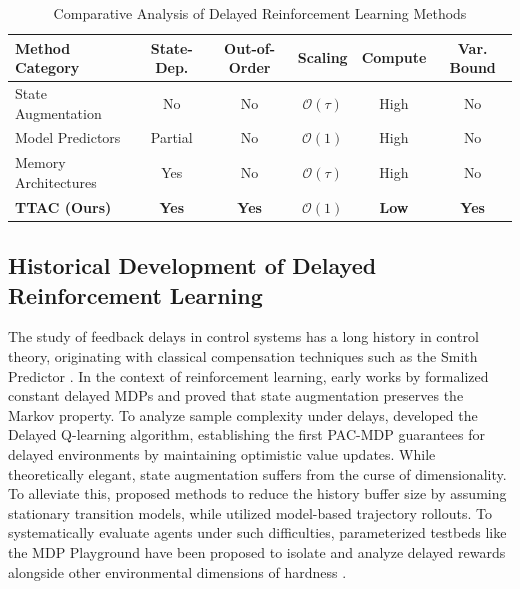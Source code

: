 \documentclass[manuscript, screen, review]{jair}
\begin{document}
\begin{table}[!t]
\centering
\caption{Comparative Analysis of Delayed Reinforcement Learning Methods}
\label{tab:taxonomy}
\vskip 0.1in
\begin{small}
\begin{tabular}{lccccc}
\toprule
\textbf{Method Category} & \textbf{State-Dep.} & \textbf{Out-of-Order} & \textbf{Scaling} & \textbf{Compute} & \textbf{Var. Bound} \\
\midrule
State Augmentation & No & No & $\mathcal{O}(\tau)$ & High & No \\
Model Predictors & Partial & No & $\mathcal{O}(1)$ & High & No \\
Memory Architectures & Yes & No & $\mathcal{O}(\tau)$ & High & No \\
\textbf{TTAC (Ours)} & \textbf{Yes} & \textbf{Yes} & \textbf{$\mathcal{O}(1)$} & \textbf{Low} & \textbf{Yes} \\
\bottomrule
\end{tabular}
\end{small}
\end{table}

\subsection{Historical Development of Delayed Reinforcement Learning}
The study of feedback delays in control systems has a long history in control theory, originating with classical compensation techniques such as the Smith Predictor \citep{smith1957constant}. In the context of reinforcement learning, early works by \citet{katsikopoulos2003markov} formalized constant delayed MDPs and proved that state augmentation preserves the Markov property. To analyze sample complexity under delays, \citet{strehl2009reinforcement} developed the Delayed Q-learning algorithm, establishing the first PAC-MDP guarantees for delayed environments by maintaining optimistic value updates. While theoretically elegant, state augmentation suffers from the curse of dimensionality. To alleviate this, \citet{walsh2010choosing} proposed methods to reduce the history buffer size by assuming stationary transition models, while \citet{bouteiller2020reinforcement} utilized model-based trajectory rollouts. To systematically evaluate agents under such difficulties, parameterized testbeds like the MDP Playground have been proposed to isolate and analyze delayed rewards alongside other environmental dimensions of hardness \citep{rajan2023mdp}.
\end{document}
